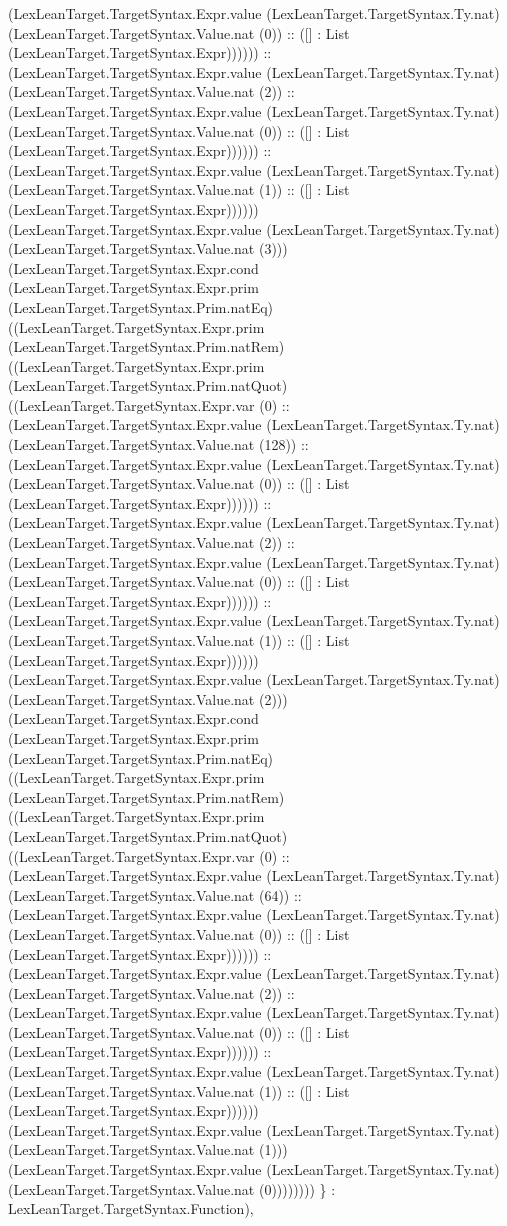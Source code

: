 \documentclass[11pt]{article}
\begin{document}
(LexLeanTarget.TargetSyntax.Expr.value (LexLeanTarget.TargetSyntax.Ty.nat) (LexLeanTarget.TargetSyntax.Value.nat (0)) :: ([] : List (LexLeanTarget.TargetSyntax.Expr)))))) :: (LexLeanTarget.TargetSyntax.Expr.value (LexLeanTarget.TargetSyntax.Ty.nat) (LexLeanTarget.TargetSyntax.Value.nat (2)) :: (LexLeanTarget.TargetSyntax.Expr.value (LexLeanTarget.TargetSyntax.Ty.nat) (LexLeanTarget.TargetSyntax.Value.nat (0)) :: ([] : List (LexLeanTarget.TargetSyntax.Expr)))))) :: (LexLeanTarget.TargetSyntax.Expr.value (LexLeanTarget.TargetSyntax.Ty.nat) (LexLeanTarget.TargetSyntax.Value.nat (1)) :: ([] : List (LexLeanTarget.TargetSyntax.Expr)))))) (LexLeanTarget.TargetSyntax.Expr.value (LexLeanTarget.TargetSyntax.Ty.nat) (LexLeanTarget.TargetSyntax.Value.nat (3))) (LexLeanTarget.TargetSyntax.Expr.cond (LexLeanTarget.TargetSyntax.Expr.prim (LexLeanTarget.TargetSyntax.Prim.natEq) ((LexLeanTarget.TargetSyntax.Expr.prim (LexLeanTarget.TargetSyntax.Prim.natRem) ((LexLeanTarget.TargetSyntax.Expr.prim (LexLeanTarget.TargetSyntax.Prim.natQuot) ((LexLeanTarget.TargetSyntax.Expr.var (0) :: (LexLeanTarget.TargetSyntax.Expr.value (LexLeanTarget.TargetSyntax.Ty.nat) (LexLeanTarget.TargetSyntax.Value.nat (128)) :: (LexLeanTarget.TargetSyntax.Expr.value (LexLeanTarget.TargetSyntax.Ty.nat) (LexLeanTarget.TargetSyntax.Value.nat (0)) :: ([] : List (LexLeanTarget.TargetSyntax.Expr)))))) :: (LexLeanTarget.TargetSyntax.Expr.value (LexLeanTarget.TargetSyntax.Ty.nat) (LexLeanTarget.TargetSyntax.Value.nat (2)) :: (LexLeanTarget.TargetSyntax.Expr.value (LexLeanTarget.TargetSyntax.Ty.nat) (LexLeanTarget.TargetSyntax.Value.nat (0)) :: ([] : List (LexLeanTarget.TargetSyntax.Expr)))))) :: (LexLeanTarget.TargetSyntax.Expr.value (LexLeanTarget.TargetSyntax.Ty.nat) (LexLeanTarget.TargetSyntax.Value.nat (1)) :: ([] : List (LexLeanTarget.TargetSyntax.Expr)))))) (LexLeanTarget.TargetSyntax.Expr.value (LexLeanTarget.TargetSyntax.Ty.nat) (LexLeanTarget.TargetSyntax.Value.nat (2))) (LexLeanTarget.TargetSyntax.Expr.cond (LexLeanTarget.TargetSyntax.Expr.prim (LexLeanTarget.TargetSyntax.Prim.natEq) ((LexLeanTarget.TargetSyntax.Expr.prim (LexLeanTarget.TargetSyntax.Prim.natRem) ((LexLeanTarget.TargetSyntax.Expr.prim (LexLeanTarget.TargetSyntax.Prim.natQuot) ((LexLeanTarget.TargetSyntax.Expr.var (0) :: (LexLeanTarget.TargetSyntax.Expr.value (LexLeanTarget.TargetSyntax.Ty.nat) (LexLeanTarget.TargetSyntax.Value.nat (64)) :: (LexLeanTarget.TargetSyntax.Expr.value (LexLeanTarget.TargetSyntax.Ty.nat) (LexLeanTarget.TargetSyntax.Value.nat (0)) :: ([] : List (LexLeanTarget.TargetSyntax.Expr)))))) :: (LexLeanTarget.TargetSyntax.Expr.value (LexLeanTarget.TargetSyntax.Ty.nat) (LexLeanTarget.TargetSyntax.Value.nat (2)) :: (LexLeanTarget.TargetSyntax.Expr.value (LexLeanTarget.TargetSyntax.Ty.nat) (LexLeanTarget.TargetSyntax.Value.nat (0)) :: ([] : List (LexLeanTarget.TargetSyntax.Expr)))))) :: (LexLeanTarget.TargetSyntax.Expr.value (LexLeanTarget.TargetSyntax.Ty.nat) (LexLeanTarget.TargetSyntax.Value.nat (1)) :: ([] : List (LexLeanTarget.TargetSyntax.Expr)))))) (LexLeanTarget.TargetSyntax.Expr.value (LexLeanTarget.TargetSyntax.Ty.nat) (LexLeanTarget.TargetSyntax.Value.nat (1))) (LexLeanTarget.TargetSyntax.Expr.value (LexLeanTarget.TargetSyntax.Ty.nat) (LexLeanTarget.TargetSyntax.Value.nat (0)))))))) \} : LexLeanTarget.TargetSyntax.Function), 
\end{document}
